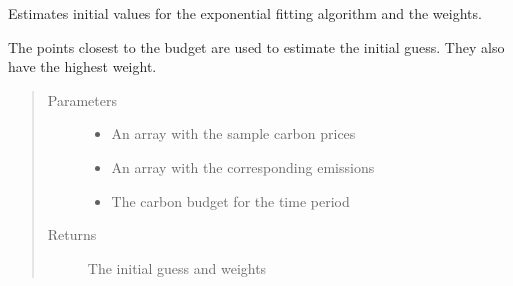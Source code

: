 \documentclass[letterpaper,10pt,english]{sphinxmanual}
\begin{document}

\begin{fulllineitems}
\label{\detokenize{api:muse.carbon_budget.exp_guess_and_weights}}
Estimates initial values for the exponential fitting algorithm and the
weights.

The points closest to the budget are used to estimate the initial guess. They also
have the highest weight.
\begin{quote}\begin{description}
\item[{Parameters}] \leavevmode\begin{itemize}
\item {} 
 \textendash{} An array with the sample carbon prices

\item {} 
 \textendash{} An array with the corresponding emissions

\item {} 
 \textendash{} The carbon budget for the time period

\end{itemize}

\item[{Returns}] \leavevmode
The initial guess and weights

\end{description}\end{quote}

\end{fulllineitems}

\end{document}
